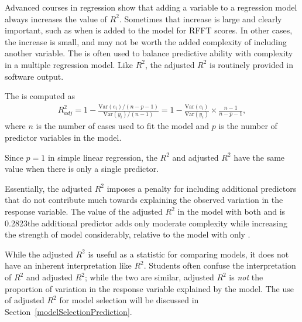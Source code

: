 Advanced courses in regression show that adding a variable to a regression model always increases the value of $R^2$. Sometimes that increase is large and clearly important, such as when  is added to the model for RFFT scores. In other cases, the increase is small, and may not be worth the added complexity of including another variable. The  is often used to balance predictive ability with complexity in a multiple regression model. Like $R^2$, the adjusted $R^2$ is routinely provided in software output. 

\begin{termBox}{
The  is computed as
\begin{align*}
R_{adj}^{2} = 1-\frac{\text{Var}(e_i) / (n-p-1)}{\text{Var}(y_i) / (n-1)}
	= 1-\frac{\text{Var}(e_i)}{\text{Var}(y_i)} \times
    \frac{n-1}{n-p-1},
\end{align*}
where $n$ is the number of cases used to fit the model and $p$ is the number of predictor variables in the model.}
\end{termBox}

Since $p = 1$ in simple linear regression, the $R^2$ and adjusted $R^2$ have the same value when there is only a single predictor. 

Essentially, the adjusted $R^2$ imposes a penalty for including additional predictors that do not contribute much towards explaining the observed variation in the response variable. The value of the adjusted $R^2$ in the model with both  and  is 0.2823\textemdash the additional predictor  adds only moderate complexity while increasing the strength of model considerably, relative to the model with only .

While the adjusted $R^2$ is useful as a statistic for comparing models, it does not have an inherent interpretation like $R^2$. Students often confuse the interpretation of $R^2$ and adjusted $R^2$; while the two are similar, adjusted $R^2$ is \emph{not} the proportion of variation in the response variable explained by the model. The use of adjusted $R^2$ for model selection will be discussed in Section~\ref{modelSelectionPrediction}.


